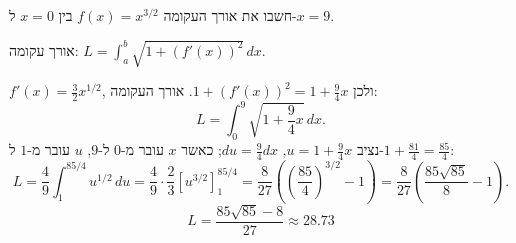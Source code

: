 
\begin{question}
חשבו את אורך העקומה $f(x)=x^{3/2}$ בין $x=0$ ל-$x=9$.
\end{question}

\begin{hint}
אורך עקומה: $L=\int_a^b\sqrt{1+(f'(x))^2}\,dx$.
\end{hint}

\begin{solution}
$f'(x)=\frac32x^{1/2}$, ולכן $1+(f'(x))^2=1+\frac94x$. אורך העקומה:
\[ L=\int_0^9\sqrt{1+\frac94x}\,dx. \]
נציב $u=1+\frac94x$, $du=\frac94dx$; כאשר $x$ עובר מ-$0$ ל-$9$, $u$ עובר מ-$1$ ל-$1+\frac{81}{4}=\frac{85}{4}$:
\[ L=\frac49\int_1^{85/4}u^{1/2}\,du=\frac49\cdot\frac23\left[u^{3/2}\right]_1^{85/4}=\frac{8}{27}\left(\left(\frac{85}{4}\right)^{3/2}-1\right)=\frac{8}{27}\left(\frac{85\sqrt{85}}{8}-1\right). \]
\[ \boxed{L=\frac{85\sqrt{85}-8}{27}\approx28.73} \]
\end{solution}
